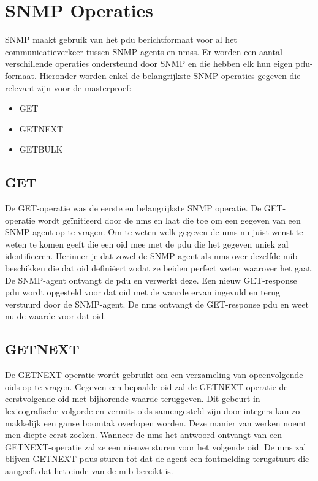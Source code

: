\section{SNMP Operaties}
\label{snmp-operaties}
SNMP maakt gebruik van het \gls{pdu} berichtformaat voor al het communicatieverkeer tussen SNMP-agents en \glspl{nms}.
Er worden een aantal verschillende operaties ondersteund door SNMP en die hebben elk hun eigen \gls{pdu}-formaat\cite{essentialsnmp}.
Hieronder worden enkel de belangrijkste SNMP-operaties gegeven die relevant zijn voor de masterproef:

\begin{itemize}
	\item GET
	\item GETNEXT
	\item GETBULK
\end{itemize}


\subsection{GET}
De GET-operatie was de eerste en belangrijkste SNMP operatie.
De GET-operatie wordt geïnitieerd door de \gls{nms} en laat die toe om een gegeven van een SNMP-agent op te vragen.
Om te weten welk gegeven de \gls{nms} nu juist wenst te weten te komen geeft die een \gls{oid} mee met de \gls{pdu} die het gegeven uniek zal identificeren.
Herinner je dat zowel de SNMP-agent als \gls{nms} over dezelfde \gls{mib} beschikken die dat \gls{oid} definiëert zodat ze beiden perfect weten waarover het gaat.
De SNMP-agent ontvangt de \gls{pdu} en verwerkt deze. Een nieuw GET-response \gls{pdu} wordt opgesteld voor dat \gls{oid} met de waarde ervan ingevuld en
terug verstuurd door de SNMP-agent. De \gls{nms} ontvangt de GET-response \gls{pdu} en weet nu de waarde voor dat \gls{oid}.



\subsection{GETNEXT}
De GETNEXT-operatie wordt gebruikt om een verzameling van opeenvolgende \glspl{oid} op te vragen.
Gegeven een bepaalde \gls{oid} zal de GETNEXT-operatie de eerstvolgende \gls{oid} met bijhorende waarde teruggeven.
Dit gebeurt in lexicografische volgorde en vermits \glspl{oid} samengesteld zijn door integers kan zo makkelijk een ganse boomtak overlopen worden.
Deze manier van werken noemt men diepte-eerst zoeken.\cite{essentialsnmp}
Wanneer de \gls{nms} het antwoord ontvangt van een GETNEXT-operatie zal ze een nieuwe sturen voor het volgende \gls{oid}.
De \gls{nms} zal blijven GETNEXT-\glspl{pdu} sturen tot dat de agent een foutmelding terugstuurt die aangeeft dat het einde van de \gls{mib} bereikt is.

